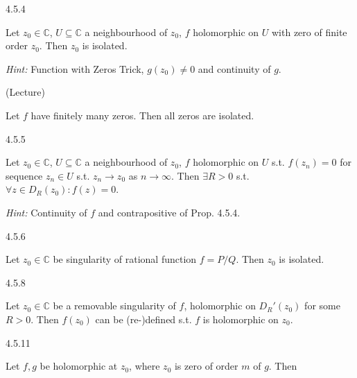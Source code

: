 \documentclass[10pt,landscape]{article}
\newcommand{\Hint}{\textit{Hint: }}
\begin{document}
\begin{multicols}{3}
\begin{proposition}{4.5.4}{}

    Let $z_0 \in \mathbb{C}$, $U \subseteq \mathbb{C}$ a neighbourhood of $z_0$, $f$ holomorphic on $U$ with zero of finite order $z_0$. Then $z_0$ is isolated.

    \Hint Function with Zeros Trick, $g(z_0) \neq 0$ and continuity of $g$.

\end{proposition}

\begin{corollary}{(Lecture)}{}

    Let $f$ have finitely many zeros. Then all zeros are isolated.

\end{corollary}

\begin{corollary}{4.5.5}{}

    Let $z_0 \in \mathbb{C}$, $U \subseteq \mathbb{C}$ a neighbourhood of $z_0$, $f$ holomorphic on $U$ s.t. $f(z_n) = 0$ for sequence $z_n \in U$ s.t. $z_n \to z_0$ as $n \to \infty$. Then $\exists R > 0$ s.t. $\forall z \in D_R(z_0): f(z) = 0$.

    \Hint Continuity of $f$ and contrapositive of Prop. 4.5.4.

\end{corollary}

\begin{corollary}{4.5.6}{}

    Let $z_0 \in \mathbb{C}$ be singularity of rational function $f = P/Q$. Then $z_0$ is isolated.

\end{corollary}

\begin{theorem}{4.5.8}{}

    Let $z_0 \in \mathbb{C}$ be a removable singularity of $f$, holomorphic on $D_R'(z_0)$ for some $R > 0$. Then $f(z_0)$ can be (re-)defined s.t. $f$ is holomorphic on $z_0$.

\end{theorem}

\begin{lemma}{4.5.11}{}

    Let $f,g$ be holomorphic at $z_0$, where $z_0$ is zero of order $m$ of $g$. Then


\end{lemma}
\end{multicols}
\end{document}
